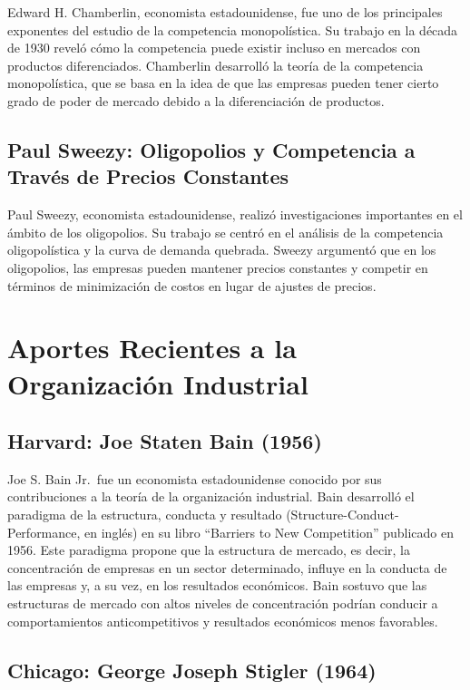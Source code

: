\documentclass[
  doc,
  floatsintext,
  longtable,
  a4paper,
  nolmodern,
  notxfonts,
  notimes,
  12pt,
  colorlinks=true,linkcolor=blue,citecolor=blue,urlcolor=blue]{apa7}
\begin{document}
Edward H. Chamberlin, economista estadounidense, fue uno de los
principales exponentes del estudio de la competencia monopolística. Su
trabajo en la década de 1930 reveló cómo la competencia puede existir
incluso en mercados con productos diferenciados. Chamberlin desarrolló
la teoría de la competencia monopolística, que se basa en la idea de que
las empresas pueden tener cierto grado de poder de mercado debido a la
diferenciación de productos.

\subsection{Paul Sweezy: Oligopolios y Competencia a Través de Precios
Constantes}\label{paul-sweezy-oligopolios-y-competencia-a-travuxe9s-de-precios-constantes}

Paul Sweezy, economista estadounidense, realizó investigaciones
importantes en el ámbito de los oligopolios. Su trabajo se centró en el
análisis de la competencia oligopolística y la curva de demanda
quebrada. Sweezy argumentó que en los oligopolios, las empresas pueden
mantener precios constantes y competir en términos de minimización de
costos en lugar de ajustes de precios.

\section{Aportes Recientes a la Organización
Industrial}\label{aportes-recientes-a-la-organizaciuxf3n-industrial}

\subsection{Harvard: Joe Staten Bain
(1956)}\label{harvard-joe-staten-bain-1956}

Joe S. Bain Jr.~fue un economista estadounidense conocido por sus
contribuciones a la teoría de la organización industrial. Bain
desarrolló el paradigma de la estructura, conducta y resultado
(Structure-Conduct-Performance, en inglés) en su libro ``Barriers to New
Competition'' publicado en 1956. Este paradigma propone que la
estructura de mercado, es decir, la concentración de empresas en un
sector determinado, influye en la conducta de las empresas y, a su vez,
en los resultados económicos. Bain sostuvo que las estructuras de
mercado con altos niveles de concentración podrían conducir a
comportamientos anticompetitivos y resultados económicos menos
favorables.

\subsection{Chicago: George Joseph Stigler
(1964)}\label{chicago-george-joseph-stigler-1964}
\end{document}
